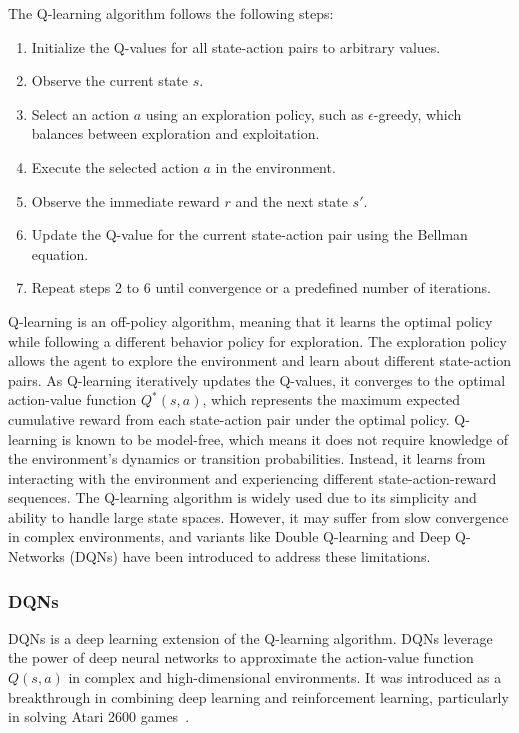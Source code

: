 The Q-learning algorithm follows the following steps:
\begin{enumerate}
    \item Initialize the Q-values for all state-action pairs to arbitrary values.
    \item Observe the current state \(s\).
    \item Select an action \(a\) using an exploration policy, such as \(\epsilon\)-greedy, which balances between exploration and exploitation.
    \item Execute the selected action \(a\) in the environment.
    \item Observe the immediate reward \(r\) and the next state \(s'\).
    \item Update the Q-value for the current state-action pair using the Bellman equation.
    \item Repeat steps 2 to 6 until convergence or a predefined number of iterations.
\end{enumerate}
Q-learning is an off-policy algorithm, meaning that it learns the optimal policy while following a different behavior policy for exploration. The exploration policy allows the agent to explore the environment and learn about different state-action pairs.
As Q-learning iteratively updates the Q-values, it converges to the optimal action-value function \(Q^*(s, a)\), which represents the maximum expected cumulative reward from each state-action pair under the optimal policy.
Q-learning is known to be model-free, which means it does not require knowledge of the environment's dynamics or transition probabilities. Instead, it learns from interacting with the environment and experiencing different state-action-reward sequences.
The Q-learning algorithm is widely used due to its simplicity and ability to handle large state spaces. However, it may suffer from slow convergence in complex environments, and variants like Double Q-learning and Deep Q-Networks (DQNs) have been introduced to address these limitations.

\subsubsection{DQNs}
DQNs is a deep learning extension of the Q-learning algorithm. DQNs leverage the power of deep neural networks to approximate the action-value function \(Q(s, a)\) in complex and high-dimensional environments. It was introduced as a breakthrough in combining deep learning and reinforcement learning, particularly in solving Atari 2600 games~\cite{Mnih2013}.


